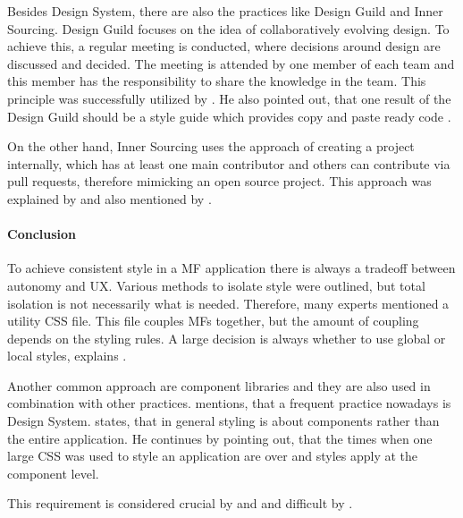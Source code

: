 Besides Design System, there are also the practices like Design Guild and Inner Sourcing.
Design Guild focuses on the idea of collaboratively evolving design.
To achieve this, a regular meeting is conducted, where decisions around design are discussed and decided.
The meeting is attended by one member of each team and this member has the responsibility to share the knowledge in the team.
This principle was successfully utilized by \textcite{Laug.2018}.
He also pointed out, that one result of the Design Guild should be a style guide which provides copy and paste ready code \cite{Laug.2018b}.

On the other hand, Inner Sourcing uses the approach of creating a project internally, which has at least one main contributor and others can contribute via pull requests, therefore mimicking an open source project.
This approach was explained by \textciteSteyer{} and also mentioned by \textcite{Jackson.2019}.



\paragraph{Conclusion}

To achieve consistent style in a \ac{MF} application there is always a tradeoff between autonomy and \ac{UX}.
Various methods to isolate style were outlined, but total isolation is not necessarily what is needed.
Therefore, many experts mentioned a utility \ac{CSS} file.
This file couples \acp{MF} together, but the amount of coupling depends on the styling rules.
A large decision is always whether to use global or local styles, explains \textciteSteyer{}.

Another common approach are component libraries and they are also used in combination with other practices.
\textciteSteyer{} mentions, that a frequent practice nowadays is Design System.
\textcite{Dornenburg.2019} states, that in general styling is about components rather than the entire application.
He continues by pointing out, that the times when one large \ac{CSS} was used to style an application are over and styles apply at the component level.

This requirement is considered crucial by \textciteRehm{} and \textciteSteyer{} and difficult by \textciteOlleck{}.
